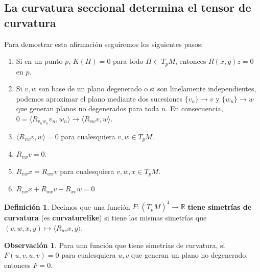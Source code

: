 \documentclass[spanish]{book}
\theoremstyle{definition}
\newtheorem*{defn}{Definición}
\newtheorem*{obs}{Observación}
\newcommand{\R}{\mathbb{R}}
\begin{document}
	\subsection{La curvatura seccional determina el tensor de curvatura}
	Para demostrar esta afirmación seguiremos los siguientes pasos:

	\begin{enumerate}
		\item Si en un punto $p$, $K(\Pi)=0$ para todo $\Pi\subset T_pM$, entonces $R(x,y)z=0$ en $p$.
		\item Si $v,w$ son base de un plano degenerado o si son linelamente independientes, podemos aproximar el plano mediante dos sucesiones $\{v_n\}\to v$ y $\{w_n\}\to w$ que generan planos no degenerados para toda $n$. En consecuencia, $0=\langle R_{v_nw_n}v_n,w_n\rangle\to\langle R_{vw}v,w\rangle$.
		
		\item $\langle R_{vw}v,w\rangle=0$ para cualesquiera $v,w\in T_pM$.
		\item $R_{vw}v=0$.
			
			\item $R_{vw}x=R_{wx}v$ para cualesquiera $v,w,x\in T_pM$.
			\item $R_{vw}x+R_{wx}v+R_{xv}w=0$
	\end{enumerate}
		\begin{defn}
		Decimos que una función $F:(T_pM)^4\to \R$ \textbf{tiene simetrías de curvatura} (es \textbf{curvaturelike}) si tiene las mismas simetrías que $(v,w,x,y)\mapsto \langle R_{uv}x,y\rangle$.
	\end{defn}
	\begin{obs}
		Para una función que tiene simetrías de curvatura, si $F(u,v,u,v)=0$ para cualesquiera $u,v$ que generan un plano no degenerado, entonces $F=0$.
	\end{obs}
	
\end{document}
